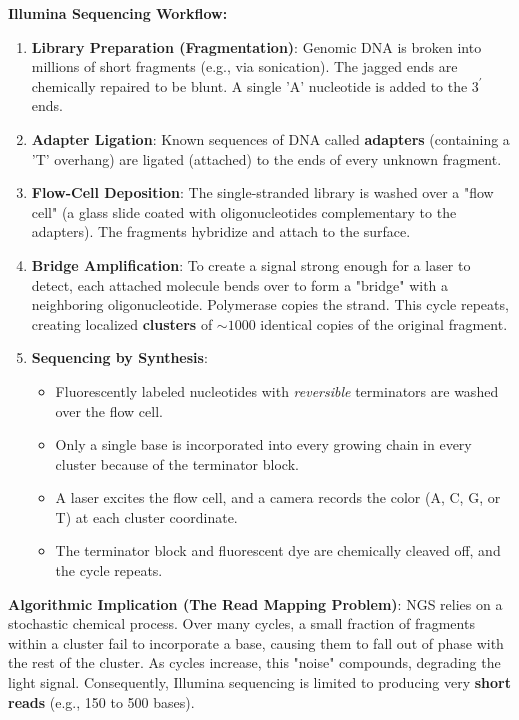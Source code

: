 \textbf{Illumina Sequencing Workflow:}
\begin{enumerate}
  \item \textbf{Library Preparation (Fragmentation)}: Genomic DNA is broken into millions of short fragments (e.g., via sonication). The jagged ends are chemically repaired to be blunt. A single 'A' nucleotide is added to the $3^{\prime}$ ends.
  \item \textbf{Adapter Ligation}: Known sequences of DNA called \textbf{adapters} (containing a 'T' overhang) are ligated (attached) to the ends of every unknown fragment.
  \item \textbf{Flow-Cell Deposition}: The single-stranded library is washed over a "flow cell" (a glass slide coated with oligonucleotides complementary to the adapters). The fragments hybridize and attach to the surface.
  \item \textbf{Bridge Amplification}: To create a signal strong enough for a laser to detect, each attached molecule bends over to form a "bridge" with a neighboring oligonucleotide. Polymerase copies the strand. This cycle repeats, creating localized \textbf{clusters} of $\sim 1000$ identical copies of the original fragment.
  \item \textbf{Sequencing by Synthesis}: 
    \begin{itemize}
        \item Fluorescently labeled nucleotides with \textit{reversible} terminators are washed over the flow cell. 
        \item Only a single base is incorporated into every growing chain in every cluster because of the terminator block.
        \item A laser excites the flow cell, and a camera records the color (A, C, G, or T) at each cluster coordinate.
        \item The terminator block and fluorescent dye are chemically cleaved off, and the cycle repeats.
    \end{itemize}
\end{enumerate}


\sta \textbf{Algorithmic Implication (The Read Mapping Problem)}: NGS relies on a stochastic chemical process. Over many cycles, a small fraction of fragments within a cluster fail to incorporate a base, causing them to fall out of phase with the rest of the cluster. As cycles increase, this "noise" compounds, degrading the light signal. Consequently, Illumina sequencing is limited to producing very \textbf{short reads} (e.g., 150 to 500 bases). 

